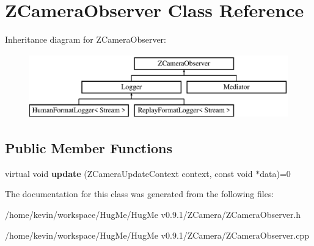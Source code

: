 \hypertarget{classZCameraObserver}{
\section{ZCameraObserver Class Reference}
\label{classZCameraObserver}
}
Inheritance diagram for ZCameraObserver:\begin{figure}[H]
\begin{center}
\leavevmode
\includegraphics[height=2.786070cm]{classZCameraObserver}
\end{center}
\end{figure}
\subsection*{Public Member Functions}
\begin{DoxyCompactItemize}
\item 
\hypertarget{classZCameraObserver_a627e480f25c0d2ef0407f6b09e6883d4}{
virtual void {\bfseries update} (ZCameraUpdateContext context, const void $\ast$data)=0}
\label{classZCameraObserver_a627e480f25c0d2ef0407f6b09e6883d4}

\end{DoxyCompactItemize}


The documentation for this class was generated from the following files:\begin{DoxyCompactItemize}
\item 
/home/kevin/workspace/HugMe/HugMe v0.9.1/ZCamera/ZCameraObserver.h\item 
/home/kevin/workspace/HugMe/HugMe v0.9.1/ZCamera/ZCameraObserver.cpp\end{DoxyCompactItemize}
